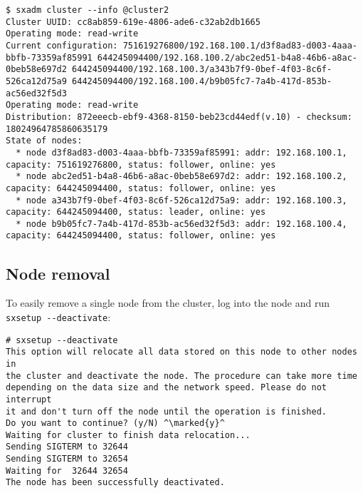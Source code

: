 \begin{lstlisting}
$ sxadm cluster --info @cluster2
Cluster UUID: cc8ab859-619e-4806-ade6-c32ab2db1665
Operating mode: read-write
Current configuration: 751619276800/192.168.100.1/d3f8ad83-d003-4aaa-bbfb-73359af85991 644245094400/192.168.100.2/abc2ed51-b4a8-46b6-a8ac-0beb58e697d2 644245094400/192.168.100.3/a343b7f9-0bef-4f03-8c6f-526ca12d75a9 644245094400/192.168.100.4/b9b05fc7-7a4b-417d-853b-ac56ed32f5d3 
Operating mode: read-write
Distribution: 872eeecb-ebf9-4368-8150-beb23cd44edf(v.10) - checksum: 18024964785860635179
State of nodes:
  * node d3f8ad83-d003-4aaa-bbfb-73359af85991: addr: 192.168.100.1, capacity: 751619276800, status: follower, online: yes
  * node abc2ed51-b4a8-46b6-a8ac-0beb58e697d2: addr: 192.168.100.2, capacity: 644245094400, status: follower, online: yes
  * node a343b7f9-0bef-4f03-8c6f-526ca12d75a9: addr: 192.168.100.3, capacity: 644245094400, status: leader, online: yes
  * node b9b05fc7-7a4b-417d-853b-ac56ed32f5d3: addr: 192.168.100.4, capacity: 644245094400, status: follower, online: yes
\end{lstlisting}

\subsection{Node removal}
To easily remove a single node from the cluster, log into the node
and run \verb+sxsetup --deactivate+:
\begin{lstlisting}
# sxsetup --deactivate
This option will relocate all data stored on this node to other nodes in
the cluster and deactivate the node. The procedure can take more time
depending on the data size and the network speed. Please do not interrupt
it and don't turn off the node until the operation is finished.
Do you want to continue? (y/N) ^\marked{y}^
Waiting for cluster to finish data relocation...
Sending SIGTERM to 32644
Sending SIGTERM to 32654
Waiting for  32644 32654
The node has been successfully deactivated.
\end{lstlisting}

